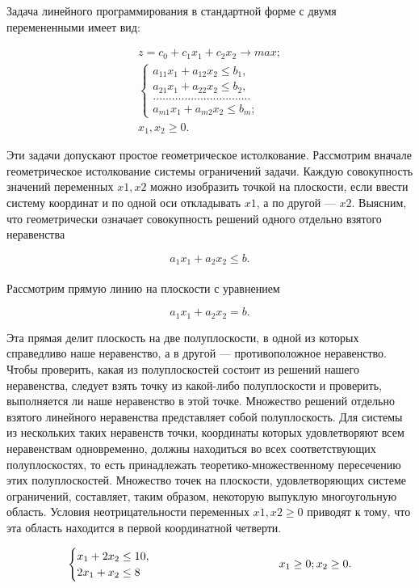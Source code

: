 Задача линейного программирования в стандартной форме с двумя перемененными имеет вид:

\begin{gather*}
z = c_{0} + c_{1}x_{1} + c_{2}x_{2} \rightarrow max;\\
\begin{cases}
a_{11}x_{1} + a_{12}x_{2} \le b_{1},\\
a_{21}x_{1} + a_{22}x_{2} \le b_{2},\\
...............................\\
a_{m1}x_{1} + a_{m2}x_{2} \le b_{m};
\end{cases}\\
x_{1},x_{2} \ge 0.
\end{gather*}

Эти задачи допускают простое геометрическое истолкование. Рассмотрим вначале геометрическое истолкование системы ограничений задачи. Каждую совокупность значений переменных $x1, x2$ можно изобразить точкой на плоскости, если ввести систему координат и по одной оси откладывать $x1$, а по другой — $x2$. Выясним, что геометрически означает совокупность решений одного отдельно взятого неравенства

$$a_{1}x_{1} + a_{2}x_{2} \le b.$$
\\Рассмотрим прямую линию на плоскости с уравнением

$$a_{1}x_{1} + a_{2}x_{2} = b.$$

Эта прямая делит плоскость на две полуплоскости, в одной из которых справедливо наше неравенство, а в другой — противоположное неравенство. Чтобы проверить, какая из полуплоскостей состоит из решений нашего неравенства, следует взять точку из какой-либо полуплоскости и проверить, выполняется ли наше неравенство в этой точке. Множество решений отдельно взятого линейного неравенства представляет собой полуплоскость. Для системы из нескольких таких неравенств точки, координаты которых удовлетворяют всем неравенствам одновременно, должны находиться во всех соответствующих полуплоскостях, то есть  принадлежать теоретико-множественному пересечению этих  полуплоскостей. Множество точек на плоскости, удовлетворяющих системе ограничений, составляет, таким образом, некоторую выпуклую многоугольную область. Условия неотрицательности переменных
$x1, x2 \ge0$ приводят к тому, что эта область находится в первой координатной четверти.


$$\begin{cases}
x_{1} + 2x_{2} \le 10,\\
2x_{1} + x_{2} \le 8
\end{cases}\\
\hspace{36mm}
x_{1} \ge 0; x_{2} \ge 0.$$

